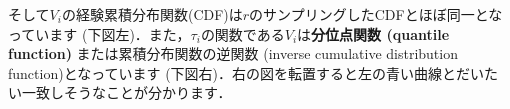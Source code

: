 そして$V_i$の経験累積分布関数(CDF)は$r$のサンプリングしたCDFとほぼ同一となっています (下図左)．また，$\tau_i$の関数である$V_i$は\textbf{分位点関数 (quantile function)} または累積分布関数の逆関数 (inverse cumulative distribution function)となっています
(下図右)．右の図を転置すると左の青い曲線とだいたい一致しそうなことが分かります．
